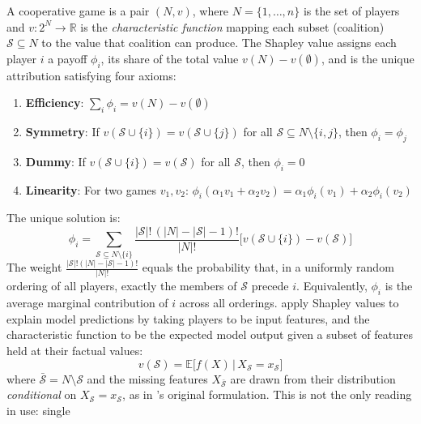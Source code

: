 \begin{definition}[SHAP]
A cooperative game is a pair $(N, v)$,
where $N = \{1, \ldots, n\}$ is the set of players and $v: 2^N \to \mathbb{R}$
is the \emph{characteristic function} mapping each subset
(coalition) $\mathcal{S} \subseteq N$ to the value that coalition can produce. The Shapley value
\citep{shapley1953} assigns each player $i$ a payoff $\phi_i$, its share of the total
value $v(N) - v(\emptyset)$, and is the unique attribution satisfying four axioms:
\begin{enumerate}
\item \textbf{Efficiency}: $\sum_i \phi_i = v(N) - v(\emptyset)$
\item \textbf{Symmetry}: If $v(\mathcal{S} \cup \{i\}) = v(\mathcal{S} \cup \{j\})$ for all
      $\mathcal{S} \subseteq N \setminus \{i,j\}$, then $\phi_i = \phi_j$
\item \textbf{Dummy}: If $v(\mathcal{S} \cup \{i\}) = v(\mathcal{S})$ for all $\mathcal{S}$, then $\phi_i = 0$
\item \textbf{Linearity}: For two games $v_1, v_2$: $\phi_i(\alpha_1 v_1 + \alpha_2 v_2)
      = \alpha_1 \phi_i(v_1) + \alpha_2 \phi_i(v_2)$
\end{enumerate}
The unique solution is:
\begin{equation}
\phi_i = \sum_{\mathcal{S} \subseteq N \setminus \{i\}}
\frac{|\mathcal{S}|!\,(|N|-|\mathcal{S}|-1)!}{|N|!}
\bigl[v(\mathcal{S} \cup \{i\}) - v(\mathcal{S})\bigr]
\label{eq:shapley}
\end{equation}
The weight $\frac{|\mathcal{S}|!(|N|-|\mathcal{S}|-1)!}{|N|!}$ equals the probability that, in a uniformly
random ordering of all players, exactly the members of $\mathcal{S}$ precede $i$. Equivalently,
$\phi_i$ is the average marginal contribution of $i$ across all orderings.
\citet{lundberg2017unified} apply Shapley values to explain model predictions by taking
players to be input features, and the characteristic function to be the expected model
output given a subset of features held at their factual values:
\begin{equation}
v(\mathcal{S}) = \mathbb{E}\bigl[f(X) \,\big\vert\, X_{\mathcal{S}} = x_{\mathcal{S}}\bigr]
\label{eq:plain_shap_value}
\end{equation}
\noindent where $\bar{\mathcal{S}} = N \setminus \mathcal{S}$ and the missing features
$X_{\bar{\mathcal{S}}}$ are drawn from their distribution \emph{conditional} on
$X_{\mathcal{S}} = x_{\mathcal{S}}$, as in \citeauthor{lundberg2017unified}'s original
formulation. This is not the only reading in use: \citet{janzing2020feature} single

\end{definition}
